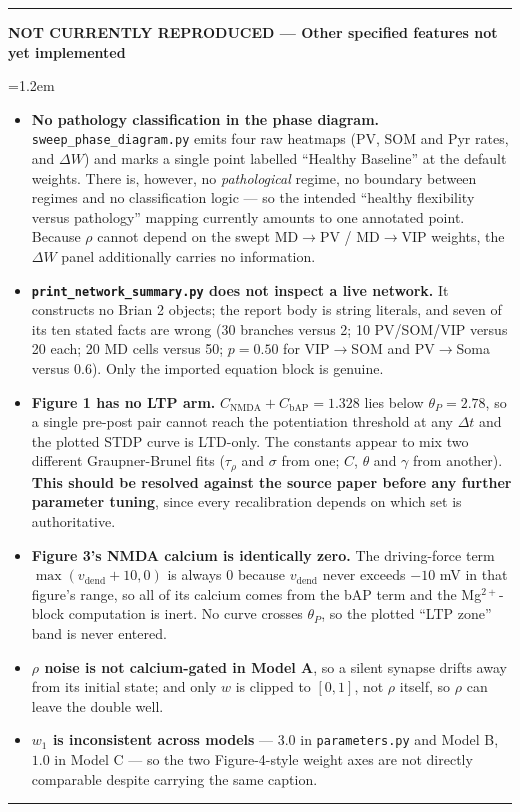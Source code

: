 \documentclass[11pt,a4paper]{article}
\newenvironment{gapbox}[1]{%
  \par\medskip\noindent
  \textcolor{gapred}{\rule{\linewidth}{1.1pt}}\par\nobreak\vspace{2pt}%
  \noindent\textcolor{gapred}{\textbf{NOT CURRENTLY REPRODUCED --- #1}}%
  \par\nobreak\vspace{3pt}%
  \begingroup\leftskip=1.2em\relax\small
}{%
  \par\endgroup\vspace{3pt}%
  \noindent\textcolor{gapred}{\rule{\linewidth}{0.5pt}}\par\medskip
}
\begin{document}
\begin{gapbox}{Other specified features not yet implemented}
\begin{itemize}
    \item \textbf{No pathology classification in the phase diagram.}
      \texttt{sweep\_phase\_diagram.py} emits four raw heatmaps (PV, SOM and Pyr rates,
      and $\Delta W$) and marks a single point labelled ``Healthy Baseline'' at the
      default weights. There is, however, no \emph{pathological} regime, no boundary
      between regimes and no classification logic --- so the intended ``healthy
      flexibility versus pathology'' mapping currently amounts to one annotated point.
      Because $\rho$ cannot depend on the swept MD$\rightarrow$PV /
      MD$\rightarrow$VIP weights, the $\Delta W$ panel additionally carries no
      information.
    \item \textbf{\texttt{print\_network\_summary.py} does not inspect a live network.}
      It constructs no Brian 2 objects; the report body is string literals, and seven
      of its ten stated facts are wrong (30 branches versus 2; 10 PV/SOM/VIP versus 20
      each; 20 MD cells versus 50; $p = 0.50$ for VIP$\rightarrow$SOM and
      PV$\rightarrow$Soma versus $0.6$). Only the imported equation block is genuine.
    \item \textbf{Figure 1 has no LTP arm.} $C_{\text{NMDA}} + C_{\text{bAP}} = 1.328$
      lies below $\theta_P = 2.78$, so a single pre-post pair cannot reach the
      potentiation threshold at any $\Delta t$ and the plotted STDP curve is LTD-only.
      The constants appear to mix two different Graupner-Brunel fits
      ($\tau_\rho$ and $\sigma$ from one; $C$, $\theta$ and $\gamma$ from another).
      \textbf{This should be resolved against the source paper before any further
      parameter tuning}, since every recalibration depends on which set is
      authoritative.
    \item \textbf{Figure 3's NMDA calcium is identically zero.} The driving-force term
      $\max(v_{\text{dend}} + 10, 0)$ is always $0$ because $v_{\text{dend}}$ never
      exceeds $-10$ mV in that figure's range, so all of its calcium comes from the
      bAP term and the Mg$^{2+}$-block computation is inert. No curve crosses
      $\theta_P$, so the plotted ``LTP zone'' band is never entered.
    \item \textbf{$\rho$ noise is not calcium-gated in Model A}, so a silent synapse
      drifts away from its initial state; and only $w$ is clipped to $[0,1]$, not
      $\rho$ itself, so $\rho$ can leave the double well.
    \item \textbf{$w_1$ is inconsistent across models} --- $3.0$ in
      \texttt{parameters.py} and Model B, $1.0$ in Model C --- so the two Figure-4-style
      weight axes are not directly comparable despite carrying the same caption.
\end{itemize}
\end{gapbox}
\end{document}
